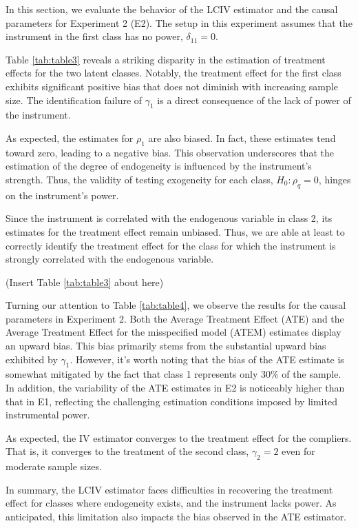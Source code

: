 \documentclass[12pt]{article}
\begin{document}
In this section, we evaluate the behavior of the LCIV estimator and the causal parameters for Experiment 2 (E2). The setup in this experiment assumes that the instrument in the first class has no power,  $\delta_{11} = 0$. 

Table \ref{tab:table3} reveals a striking disparity in the estimation of treatment effects for the two latent classes. Notably, the treatment effect for the first class exhibits significant positive bias that does not diminish with increasing sample size. The identification failure of $\gamma_1$ is a direct consequence of the lack of power of the instrument. 

As expected, the estimates for $\rho_1$ are also biased. In fact, these estimates tend toward zero, leading to a negative bias. This observation underscores that the estimation of the degree of endogeneity is influenced by the instrument's strength. Thus, the validity of testing exogeneity for each class, $H_0: \rho_q = 0$, hinges on the instrument's power.

Since the instrument is correlated with the endogenous variable in class 2, its estimates for the treatment effect remain unbiased. Thus, we are able at least to correctly identify the treatment effect for the class for which the instrument is strongly correlated with the endogenous variable.

\begin{center}
	(Insert Table \ref{tab:table3} about here)
\end{center}

Turning our attention to Table \ref{tab:table4}, we observe the results for the causal parameters in Experiment 2. Both the Average Treatment Effect (ATE) and the Average Treatment Effect for the misspecified model (ATEM) estimates display an upward bias. This bias primarily stems from the substantial upward bias exhibited by $\gamma_1$. However, it's worth noting that the bias of the ATE estimate is somewhat mitigated by the fact that class 1 represents only 30\% of the sample. In addition, the variability of the ATE estimates in E2 is noticeably higher than that in E1, reflecting the challenging estimation conditions imposed by limited instrumental power. 

As expected, the IV estimator converges to the treatment effect for the compliers. That is, it converges to the treatment of the second class, $\gamma_{2} = 2$ even for moderate sample sizes. 

In summary, the LCIV estimator faces difficulties in recovering the treatment effect for classes where endogeneity exists, and the instrument lacks power. As anticipated, this limitation also impacts the bias observed in the ATE estimator.
\end{document}
